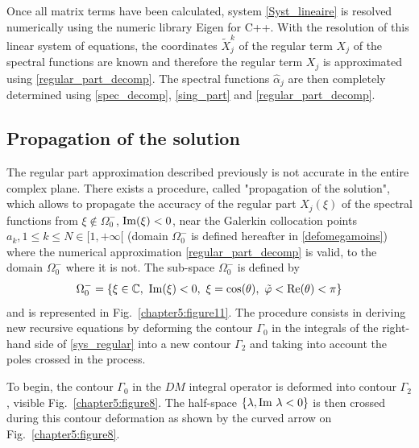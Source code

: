 Once all matrix terms have been calculated, system \eqref{Syst_lineaire} is resolved numerically using the numeric library Eigen for C++. With the resolution of this linear system of equations, the coordinates $\tilde{X}_j^k$ of the regular term $X_j$ of the spectral functions are known and therefore the regular term $X_j$ is approximated using \eqref{regular_part_decomp}. The spectral functions $\hat{\alpha}_j$ are then completely determined using \eqref{spec_decomp}, \eqref{sing_part} and \eqref{regular_part_decomp}. 

\subsection{Propagation of the solution}
\label{propag_sol}
The regular part approximation described previously is not accurate in the entire complex plane. There exists a procedure, called "propagation of the solution", which allows to propagate the accuracy of the regular part $X_j(\xi)$ of the spectral functions from $\xi \notin \Omega_0^-$, ${\rm Im} (\xi) <0$, near the Galerkin collocation points $a_k, 1\leq k \leq N \in \lbrack 1, +\infty \lbrack$ (domain $\Omega_0^-$ is defined hereafter in \eqref{defomegamoins}) where the numerical approximation \eqref{regular_part_decomp} is valid, to the domain $\Omega_0^-$ where it is not. The sub-space $\Omega_0^-$ is defined by
\begin{equation}
\label{defomegamoins}
\Omega_0^- = \{\xi \in \mathbb C, \ {\rm Im}(\xi) <0, \  \xi=\cos(\theta), \ \tilde{\varphi} < {\rm Re}(\theta)<\pi\}
\end{equation}
and is represented in Fig.~\ref{chapter5:figure11}. The procedure consists in deriving new recursive equations by deforming the  contour $\Gamma_0$ in the integrals of the right-hand side of \eqref{sys_regular} into a new contour $\Gamma_2$ and taking into account the poles crossed in the process.

To begin, the contour $\Gamma_0$ in the $DM$ integral operator is deformed into contour $\Gamma_2$, visible Fig.~\ref{chapter5:figure8}. The half-space $\{ \lambda, {\rm Im} \ \lambda < 0 \}$ is then crossed during this contour deformation as shown by the curved arrow on Fig.~\ref{chapter5:figure8}.

